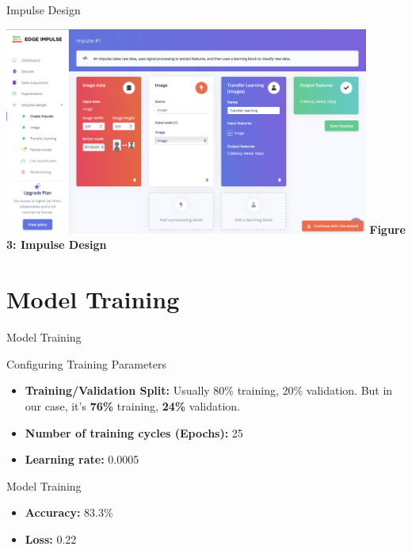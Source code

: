 \documentclass[10pt, a4paper]{beamer}
\begin{document}
\begin{frame}{Impulse Design}
		
		\centering
		\includegraphics[width=0.9\textwidth]{images/ImpulseDesign.png}
		\textbf{Figure 3: Impulse Design}
	
\end{frame}

	\section{Model Training}
\begin{frame}{Model Training}
	\begin{block}{Configuring Training Parameters}
		\begin{itemize}
			\item \textbf{Training/Validation Split:} Usually 80\% training, 20\% validation. But in our case, it's \textbf{76\%} training, \textbf{24\%} validation.
			\item \textbf{Number of training cycles (Epochs):} 25
			\item \textbf{Learning rate:} 0.0005
		\end{itemize}
	\end{block}
	
	\begin{block}{Model Training}
		\begin{itemize}
			\item \textbf{Accuracy:} 83.3\%
			\item \textbf{Loss:} 0.22
		\end{itemize}
	\end{block}
\end{frame}
\end{document}
